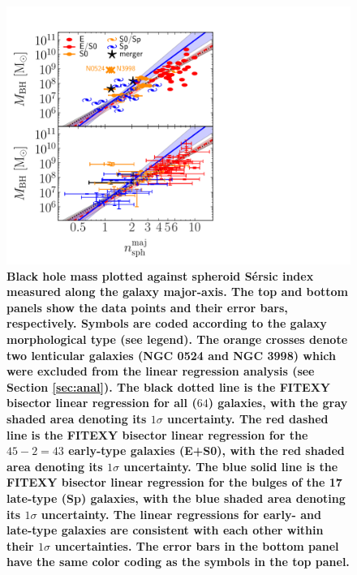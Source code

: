 \documentclass[preprint2]{emulateapj}
\begin{document}
\begin{figure}[h]
\begin{center}
\includegraphics[width=\columnwidth, trim = 20 0 220 0]{images/mbh_vs_n_maj.pdf}
\caption{\bf Black hole mass plotted against spheroid S\'ersic index measured along the galaxy major-axis. 
The top and bottom panels show the data points and their error bars, respectively.  
Symbols are coded according to the galaxy morphological type (see legend). 
The orange crosses denote two lenticular galaxies (NGC 0524 and NGC 3998) which were excluded from the linear regression analysis 
(see Section \ref{sec:anal}). 
The black dotted line is the FITEXY bisector linear regression for all ($64$) galaxies, 
with the gray shaded area denoting its $1\sigma$ uncertainty. 
The red dashed line is the FITEXY bisector linear regression for the $45-2=43$  early-type galaxies (E+S0), 
with the red shaded area denoting its $1\sigma$ uncertainty. 
The blue solid line is the FITEXY bisector linear regression for the bulges of the 17 late-type (Sp) galaxies, 
with the blue shaded area denoting its $1\sigma$ uncertainty. 
The linear regressions for early- and late-type galaxies are consistent with each other within their $1\sigma$ uncertainties.  
The error bars in the bottom panel have the same color coding as the symbols in the top panel. 
}
\label{fig:mbhn}
\end{center}
\end{figure}
\end{document}

